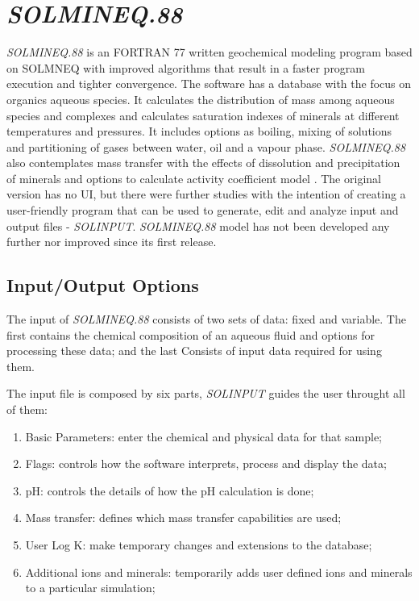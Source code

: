 \section{\emph{SOLMINEQ.88}}
\emph{SOLMINEQ.88} is an FORTRAN 77 written geochemical modeling program based on SOLMNEQ \cite{Kharaka:73} with improved algorithms that result in a faster program execution and tighter convergence. The software has a database with the focus on organics aqueous species. It calculates the distribution of mass among aqueous species and complexes and calculates saturation indexes of minerals at different temperatures and pressures. It includes options as boiling, mixing of solutions and partitioning of gases between water, oil and a vapour phase. \emph{SOLMINEQ.88} also contemplates mass transfer with the effects of dissolution and precipitation of minerals and options to calculate activity coefficient model \cite{Kharaka:88}. The original version has no UI, but there were further studies with the intention of creating a user-friendly program that can be used to generate, edit and analyze input and output files - \emph{SOLINPUT}.
\emph{SOLMINEQ.88} model has not been developed any further nor improved since its first release.

\subsection{Input/Output Options}
The input of \emph{SOLMINEQ.88} consists of two sets of data: fixed and variable. The first contains the chemical composition of an aqueous fluid and options for processing these data; and the last Consists of input data required for using them.

The input file is composed by six parts, \emph{SOLINPUT} guides the user throught all of them:
\begin{enumerate}
\item Basic Parameters: enter the chemical and physical data for that sample;
\item Flags: controls how the software interprets, process and display the data;
\item pH: controls the details of how the pH calculation is done;
\item Mass transfer: defines which mass transfer capabilities are used;
\item User Log K: make temporary changes and extensions to the database;
\item Additional ions and minerals: temporarily adds user defined ions and minerals to a particular simulation;
\end{enumerate}


